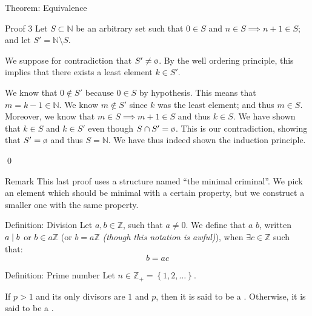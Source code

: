 \documentclass[a4paper]{article}
\begin{document}
\begin{parag}{Theorem: Equivalence}
\begin{subparag}{Proof 3}
        Let $S \subset \mathbb{N}$ be an arbitrary set such that $0 \in S$ and $n \in S \implies n + 1 \in S$; and let $S' = \mathbb{N} \setminus S$.

        We suppose for contradiction that $S' \neq \o$. By the well ordering principle, this implies that there exists a least element $k \in S'$.

        We know that $0 \not \in S'$ because $0 \in S$ by hypothesis. This means that $m = k-1 \in \mathbb{N}$. We know $m \not \in S'$ since $k$ was the least element; and thus $m \in S$. Moreover, we know that $m \in S \implies m+1 \in S$ and thus $k \in S$. We have shown that $k \in S$ and $k \in S'$ even though $S \cap S' = \o$. This is our contradiction, showing that $S' = \o$ and thus $S = \mathbb{N}$. We have thus indeed shown the induction principle.

        \qed
    \end{subparag}
    
    \begin{subparag}{Remark}
        This last proof uses a structure named ``the minimal criminal''. We pick an element which should be minimal with a certain property, but we construct a smaller one with the same property.
    \end{subparag}
\end{parag}

\begin{parag}{Definition: Division}
    Let $a, b \in \mathbb{Z}$, such that $a \neq 0$. We define that $a$  $b$, written $a \mid b$ or $b \in a\mathbb{Z}$ (or $b = a \mathbb{Z}$ \textit{(though this notation is awful)}), when $\exists c \in \mathbb{Z}$ such that: 
    \[b = ac\]
\end{parag}

\begin{parag}{Definition: Prime number}
    Let $n \in \mathbb{Z}_+ = \left\{1, 2, \ldots\right\}$.

    If $p > 1$ and its only divisors are $1$ and $p$, then it is said to be a . Otherwise, it is said to be a .
\end{parag}
\end{document}
